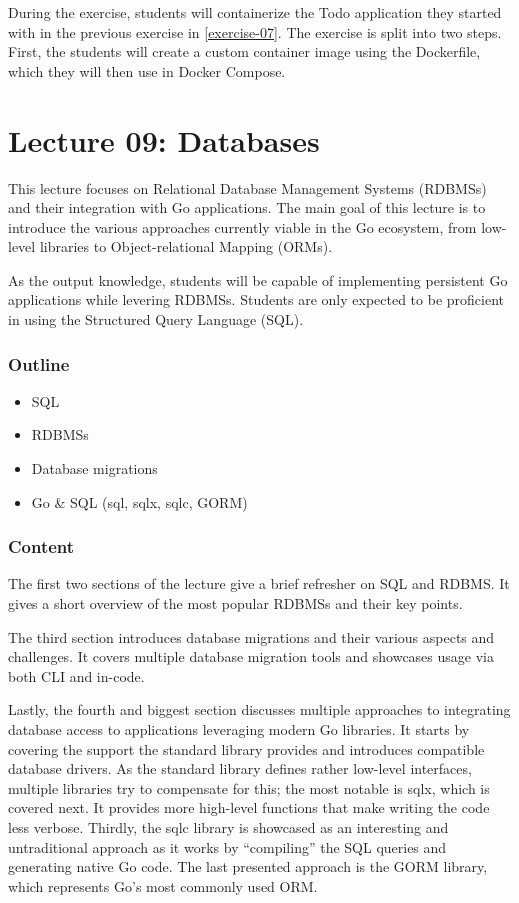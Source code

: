 \documentclass[
  digital,
  color,
  oneside,
  nosansbold,
  nocolorbold,
  nolof,
  nolot,
]{fithesis4}
\begin{document}
During the exercise, students will containerize the Todo application they started with in the previous exercise in \cref{exercise-07}. The exercise is split into two steps. First, the students will create a custom container image using the Dockerfile, which they will then use in Docker Compose.

\section{Lecture 09: Databases}\label{lecture-databases}

This lecture focuses on Relational Database Management Systems (RDBMSs) and their integration with Go applications. The main goal of this lecture is to introduce the various approaches currently viable in the Go ecosystem, from low-level libraries to Object-relational Mapping (ORMs).

As the output knowledge, students will be capable of implementing persistent Go applications while levering RDBMSs. Students are only expected to be proficient in using the Structured Query Language (SQL).

\subsubsection{Outline}

\begin{itemize}
    \item SQL
    \item RDBMSs
    \item Database migrations
    \item Go \& SQL (sql, sqlx, sqlc, GORM)
\end{itemize}

\subsubsection{Content}

The first two sections of the lecture give a brief refresher on SQL and RDBMS. It gives a short overview of the most popular RDBMSs and their key points.

The third section introduces database migrations and their various aspects and challenges. It covers multiple database migration tools and showcases usage via both CLI and in-code.

Lastly, the fourth and biggest section discusses multiple approaches to integrating database access to applications leveraging modern Go libraries. It starts by covering the
support the standard library provides and introduces compatible database drivers. As the standard library defines rather low-level interfaces, multiple libraries try to compensate for this; the most notable is sqlx\cite{sqlx}, which is covered next. It provides more high-level functions that make writing the code less verbose. Thirdly, the sqlc\cite{sqlc} library is showcased as an interesting and untraditional approach as it works by \enquote{compiling} the SQL queries and generating native Go code. The last presented approach is the GORM\cite{gorm} library, which represents Go's most commonly used ORM.
\end{document}
